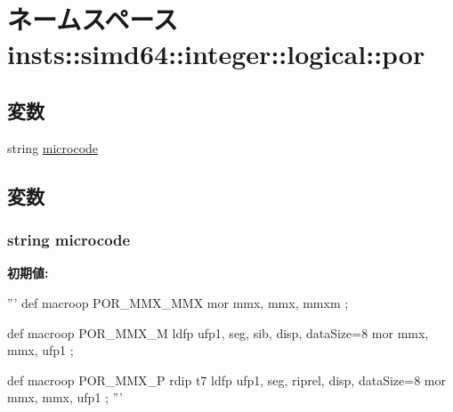 \hypertarget{namespaceinsts_1_1simd64_1_1integer_1_1logical_1_1por}{
\section{ネームスペース insts::simd64::integer::logical::por}
\label{namespaceinsts_1_1simd64_1_1integer_1_1logical_1_1por}
}
\subsection*{変数}
\begin{DoxyCompactItemize}
\item 
string \hyperlink{namespaceinsts_1_1simd64_1_1integer_1_1logical_1_1por_a770f11a173e99389a8802f0107ed8f52}{microcode}
\end{DoxyCompactItemize}


\subsection{変数}
\hypertarget{namespaceinsts_1_1simd64_1_1integer_1_1logical_1_1por_a770f11a173e99389a8802f0107ed8f52}{
\subsubsection[{microcode}]{\setlength{\rightskip}{0pt plus 5cm}string {\bf microcode}}}
\label{namespaceinsts_1_1simd64_1_1integer_1_1logical_1_1por_a770f11a173e99389a8802f0107ed8f52}
{\bfseries 初期値:}
\begin{DoxyCode}
'''
def macroop POR_MMX_MMX {
    mor mmx, mmx, mmxm
};

def macroop POR_MMX_M {
    ldfp ufp1, seg, sib, disp, dataSize=8
    mor mmx, mmx, ufp1
};

def macroop POR_MMX_P {
    rdip t7
    ldfp ufp1, seg, riprel, disp, dataSize=8
    mor mmx, mmx, ufp1
};
'''
\end{DoxyCode}
